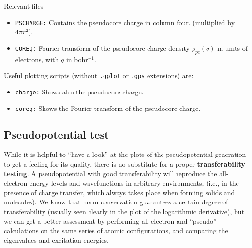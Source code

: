 \documentclass[11pt]{article}
\begin{document}
Relevant files:

\begin{itemize}
\item  {\tt PSCHARGE:} Contains the pseudocore charge in column four.
(multiplied by $4\pi r^2$).

\item {\tt COREQ:} Fourier transform of the pseudocore charge density
$\rho_{pc}(q)$ in units of electrons, with $q$ in  bohr$^{-1}$.
\end{itemize}

Useful plotting scripts (without {\tt .gplot} or {\tt .gps}
extensions) are:

\begin{itemize}
\item {\tt charge:} Shows also the pseudocore charge.
\item {\tt coreq:}  Shows the Fourier transform of the pseudocore charge.
\end{itemize}

\subsection{Pseudopotential test}

While it is helpful to ``have a look'' at the plots of the
pseudopotential generation to get a feeling for its quality, there is
no substitute for a proper {\bf transferability testing}. A
pseudopotential with good transferability will reproduce the
all-electron energy levels and wavefunctions in arbitrary
environments, (i.e., in the presence of charge transfer, which always
takes place when forming solids and molecules).  We know that norm
conservation guarantees a certain degree of transferability (usually
seen clearly in the plot of the logarithmic derivative), but we can
get a better assessment by performing all-electron and ``pseudo''
calculations on the same series of atomic configurations, and comparing
the eigenvalues and excitation energies.
\end{document}
